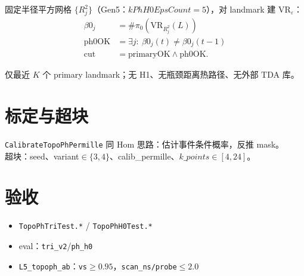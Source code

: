 固定半径平方网格 $\{R_j^2\}$（Gen5：$kPhH0EpsCount=5$），对 landmark 建 VR$_\varepsilon$：
\begin{align}
\beta0_j &= \#\pi_0\!\left(\mathrm{VR}_{R_j^2}(L)\right)\\
\mathrm{ph0OK}&=\exists j:\ \beta0_j(t)\neq\beta0_j(t-1)\\
\mathrm{cut}&=\mathrm{primaryOK}\land\mathrm{ph0OK}.
\end{align}

\begin{designbox}[非全局 PH]
仅最近 $K$ 个 primary landmark；无 H1、无瓶颈距离热路径、无外部 TDA 库。
\end{designbox}

\section{标定与超块}

\texttt{CalibrateTopoPhPermille} 同 Hom 思路：估计事件条件概率，反推 mask。\\
超块：seed、variant$\in\{3,4\}$、calib\_permille、$k\_points\in[4,24]$。

\section{验收}

\begin{itemize}[nosep]
  \item \texttt{TopoPhTriTest.*} / \texttt{TopoPhH0Test.*}
  \item eval：\texttt{tri\_v2}/\texttt{ph\_h0}
  \item \texttt{L5\_topoph\_ab}：\texttt{vs}$\ge0.95$，\texttt{scan\_ns/probe}$\le2.0$
\end{itemize}

